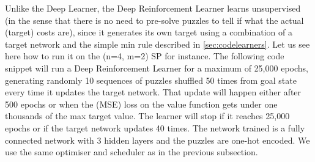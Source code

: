 Unlike the Deep Learner, the Deep Reinforcement Learner learns unsupervised (in the sense that there is no need to pre-solve puzzles to tell if what the actual (target) costs are), since it generates its own target using a combination of a target network and the simple min rule described in \ref{sec:codelearners}. Let us see here how to run it on the (n=4, m=2) SP for instance. The following code snippet will run a Deep Reinforcement Learner for a maximum of 25,000 epochs, generating randomly 10 sequences of puzzles shuffled 50 times from goal state every time it updates the target network. That update will happen either after 500 epochs or when the (MSE) loss on the value function gets under one thousands of the max target value. The learner will stop if it reaches 25,000 epochs or if the target network updates 40 times. The network trained is a fully connected network with 3 hidden layers and the puzzles are one-hot encoded. We use the same optimiser and scheduler as in the previous subsection.

\afblue
